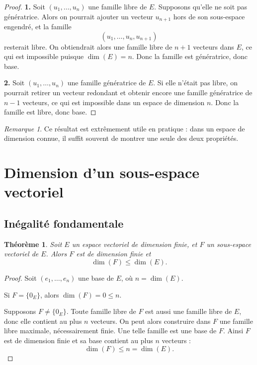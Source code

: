 \documentclass[11pt,a4paper]{article}
\newtheorem{theoreme}[definition]{Théorème}
\theoremstyle{remark}
\newtheorem{remarque}[definition]{Remarque}
\begin{document}
\begin{proof}
\textbf{1.} Soit \((u_1,\dots,u_n)\) une famille libre de \(E\). Supposons qu’elle ne soit pas génératrice. Alors on pourrait ajouter un vecteur \(u_{n+1}\) hors de son sous-espace engendré, et la famille
\[
(u_1,\dots,u_n,u_{n+1})
\]
resterait libre. On obtiendrait alors une famille libre de \(n+1\) vecteurs dans \(E\), ce qui est impossible puisque \(\dim(E)=n\). Donc la famille est génératrice, donc base.

\textbf{2.} Soit \((u_1,\dots,u_n)\) une famille génératrice de \(E\). Si elle n’était pas libre, on pourrait retirer un vecteur redondant et obtenir encore une famille génératrice de \(n-1\) vecteurs, ce qui est impossible dans un espace de dimension \(n\). Donc la famille est libre, donc base.
\end{proof}

\begin{remarque}
Ce résultat est extrêmement utile en pratique : dans un espace de dimension connue, il suffit souvent de montrer une seule des deux propriétés.
\end{remarque}

\section{Dimension d’un sous-espace vectoriel}

\subsection{Inégalité fondamentale}

\begin{theoreme}
Soit \(E\) un espace vectoriel de dimension finie, et \(F\) un sous-espace vectoriel de \(E\). Alors \(F\) est de dimension finie et
\[
\dim(F)\le \dim(E).
\]
\end{theoreme}

\begin{proof}
Soit \((e_1,\dots,e_n)\) une base de \(E\), où \(n=\dim(E)\).

Si \(F=\{0_E\}\), alors \(\dim(F)=0\le n\).

Supposons \(F\neq \{0_E\}\). Toute famille libre de \(F\) est aussi une famille libre de \(E\), donc elle contient au plus \(n\) vecteurs. On peut alors construire dans \(F\) une famille libre maximale, nécessairement finie. Une telle famille est une base de \(F\). Ainsi \(F\) est de dimension finie et sa base contient au plus \(n\) vecteurs :
\[
\dim(F)\le n=\dim(E).
\]
\end{proof}
\end{document}
